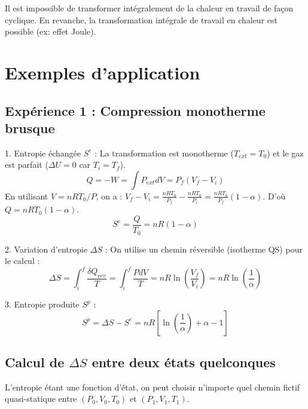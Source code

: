 \documentclass[french]{yLectureNote}
\begin{document}
\begin{theorem}[Conséquence]
    Il est impossible de transformer intégralement de la chaleur en travail de façon cyclique. En revanche, la transformation intégrale de travail en chaleur est possible (ex: effet Joule).
\end{theorem}

\section{Exemples d'application}

\subsection{Expérience 1 : Compression monotherme brusque}




1. Entropie échangée $S^e$ :
La transformation est monotherme ($T_{ext} = T_0$) et le gaz est parfait ($\Delta U = 0$ car $T_i = T_f$).
$$Q = -W = \int P_{ext} dV = P_f (V_f - V_i)$$
En utilisant $V = nRT_0/P$, on a : $V_f - V_i = \frac{nRT_0}{P_f} - \frac{nRT_0}{P_i} = \frac{nRT_0}{P_f} (1 - \alpha)$.
D'où $Q = nRT_0 (1 - \alpha)$.
$$S^e = \frac{Q}{T_0} = nR(1 - \alpha)$$

2. Variation d'entropie $\Delta S$ :
On utilise un chemin réversible (isotherme QS) pour le calcul :
$$\Delta S = \int_i^f \frac{\delta Q_{rev}}{T} = \int_i^f \frac{P dV}{T} = nR \ln\left(\frac{V_f}{V_i}\right) = nR \ln\left(\frac{1}{\alpha}\right)$$

3. Entropie produite $S^p$ :
$$S^p = \Delta S - S^e = nR \left[ \ln\left(\frac{1}{\alpha}\right) + \alpha - 1 \right]$$


\subsection{Calcul de $\Delta S$ entre deux états quelconques}

L'entropie étant une fonction d'état, on peut choisir n'importe quel chemin fictif quasi-statique entre $(P_0, V_0, T_0)$ et $(P_1, V_1, T_1)$.
\end{document}
